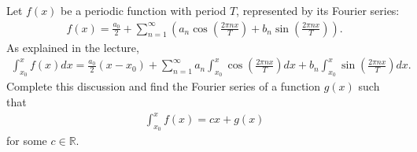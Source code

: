 \documentclass[11pt]{article}
\begin{document}
\begin{exercise}
    Let \( f(x) \) be a periodic function with period \( T \), represented by its Fourier series:
    \begin{align*}
        f(x) = \frac{a_0}{2} + \sum_{n=1}^\infty \left( a_n \cos\left(\frac{2\pi n x}{T}\right) + b_n \sin\left(\frac{2\pi n x}{T}\right) \right).
    \end{align*}
    As explained in the lecture, 
    \begin{align*}
        \int_{x_0}^{x}
        f(x) 
        dx
        = 
        \frac{a_0}{2} ( x - x_0 )
        + 
        \sum_{n=1}^{\infty} 
        a_n 
        \int_{x_0}^{x}
        \cos\left(\frac{2\pi n x}{T}\right)
        dx 
        +
        b_n
        \int_{x_0}^{x}
        \sin\left(\frac{2\pi n x}{T}\right)
        dx
        .
    \end{align*}
    Complete this discussion and find the Fourier series of a function $g(x)$ such that 
    \begin{align*}
        \int_{x_0}^{x} f(x) = c x + g(x)
    \end{align*}
    for some $c \in \mathbb R$. 
\end{exercise}
\end{document}

